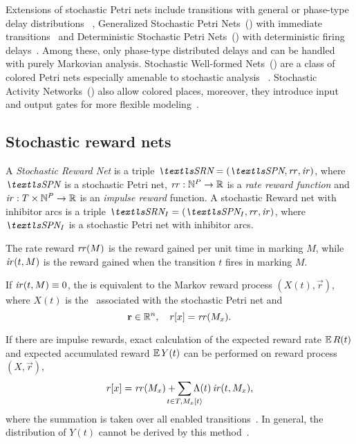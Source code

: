 Extensions of stochastic Petri nets include transitions with general
or phase-type delay distributions%
~\citep{DBLP:journals/tse/MarsanBBCCC89,Longo:2015:TSR:2767455.2767457},
Generalized Stochastic Petri Nets~() with immediate
transitions~\citep{DBLP:journals/tocs/MarsanCB84,DBLP:journals/tse/TeruelFP03}
and Deterministic Stochastic Petri Nets~() with
deterministic firing delays~\citep{DBLP:conf/apn/1986}. Among these,
only phase-type distributed delays and  can be handled
with purely Markovian analysis. Stochastic Well-formed
Nets~() are a class of colored Petri nets especially
amenable to stochastic analysis%
~\citep{DBLP:journals/tc/ChiolaDFH93}. Stochastic Activity
Networks~() also allow colored places, moreover, they
introduce input and output gates for more flexible
modeling~\citep{DBLP:conf/pnpm/1985}.

\subsection{Stochastic reward nets}

\begin{dfn}
  A \emph{Stochastic Reward Net} is a triple
  $\SRN = (\SPN, \rateReward, \impulseReward)$, where $\SPN$ is a
  stochastic Petri net,
  $\mathit{rr}: \mathbb{N}^P \to \mathbb{R}$ is a \emph{rate reward function} and
  $\mathit{ir}: T \times \mathbb{N}^P \to \mathbb{R}$ is an \emph{impulse reward}
  function. A stochastic Reward net with inhibitor arcs is a triple
  $\SRN_I = (\SPN_I, \rateReward, \impulseReward)$, where $\SPN_I$ is
  a stochastic Petri net with inhibitor arcs.
\end{dfn}

The rate reward $\mathit{rr}(M)$ is the reward gained per unit time in
marking $M$, while $\mathit{ir}(t, M)$ is the reward gained when
the transition $t$ fires in marking $M$.

If $\mathit{ir}(t, M) \equiv 0$, the  is
equivalent to the Markov reward process $(X(t), \vec{r})$, where
$X(t)$ is the \CTMC\ associated with the stochastic Petri net and
\begin{equation}
  \bm{\mathrm{r}} \in \mathbb{R}^n, \quad r[x] = \mathit{rr}(M_x) \text.
\end{equation}

If there are impulse rewards, exact calculation of the expected reward
rate $\operatorname{\mathbb{E}} R(t)$ and expected accumulated reward $\operatorname{\mathbb{E}} Y(t)$ can be
performed on reward process $(X, \vec{r})$,
\begin{equation}
  r[x] = \rateReward(M_x) + \sum_{\mathclap{t \in T, M_x
      \tranto{t}}} \Lambda(t) \, \impulseReward(t, M_x) \text,
\end{equation}
where the summation is taken over all enabled
transitions~\citep{DBLP:journals/pe/CiardoMT91}. In general, the
distribution of $Y(t)$ cannot be derived by this
method~\citep{RACZ99a}.

